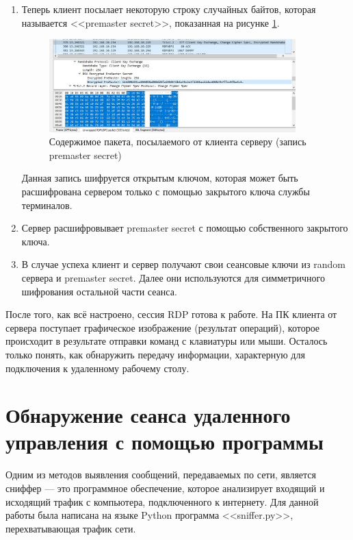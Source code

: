 \documentclass[bachelor, och, coursework]{SCWorks}
\begin{document}
\begin{enumerate}
    \item Теперь клиент посылает некоторую строку случайных байтов, которая называется <<premaster secret>>, показанная на рисунке \ref{cert1}. 
    
    \begin{figure}[H]
      \centering
      \includegraphics[width=0.9\textwidth]{photo/cert1.png}
      \caption{Содержимое пакета, посылаемого от клиента серверу (запись premaster secret)}
      \label{cert1}
    \end{figure}
    
    Данная запись шифруется открытым ключом, которая может быть расшифрована сервером только с помощью закрытого ключа службы терминалов.
    \item Сервер расшифровывает premaster secret с помощью собственного закрытого ключа.
    \item В случае успеха клиент и сервер получают свои сеансовые ключи из random сервера и premaster secret. Далее они используются для симметричного 
    шифрования остальной части сеанса.
  \end{enumerate}
  
  После того, как всё настроено, сессия RDP готова к работе. На ПК клиента от сервера поступает графическое изображение
  (результат операций), которое происходит в результате отправки команд с клавиатуры или мыши. Осталось только понять, как обнаружить передачу информации,
  характерную для подключения к удаленному рабочему столу.

  \section{Обнаружение сеанса удаленного управления с помощью программы}
  
  Одним из методов выявления сообщений, передаваемых по сети, является сниффер --- это программное обеспечение, которое анализирует входящий
  и исходящий трафик с компьютера, подключенного к интернету. Для данной работы была написана на языке Python программа <<sniffer.py>>, перехватывающая
  трафик сети.
    
\end{document}
